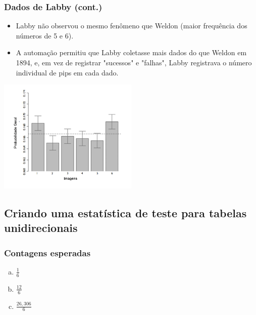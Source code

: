 
\begin{frame}
\frametitle{Dados de Labby (cont.)}

\begin{itemize}
\justifying
\item Labby não observou o mesmo fenômeno que Weldon (maior frequência dos números de 5 e 6).
\justifying
\item A automação permitiu que Labby coletasse mais dados do que Weldon em 1894, e, em vez de registrar "sucessos" e "falhas", Labby registrava o número individual de pips em cada dado.

\end{itemize}

\begin{center}
\includegraphics[width=0.5\textwidth]{6-3_chisq_gof/labbyPipCounts.png}
\end{center}

\end{frame}


\subsection*{Criando uma estatística de teste para tabelas unidirecionais}


\begin{frame}
\frametitle{Contagens esperadas}
\justifying
{}

\begin{enumerate}[(a)]
\item $\frac{1}{6}$
\item $\frac{12}{6}$
\item $\frac{26,306}{6}$
 
\end{enumerate}

\end{frame}

